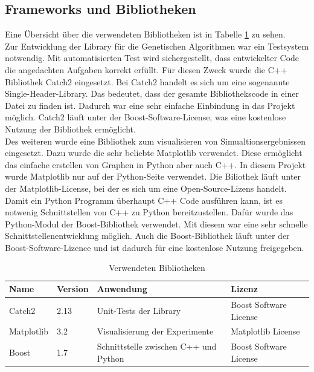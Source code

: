 \subsection{Frameworks und Bibliotheken}
Eine Übersicht über die verwendeten Bibliotheken ist in Tabelle \ref{tab:bibs} zu sehen.\\
Zur Entwicklung der Library für die Genetischen Algorithmen war ein Testsystem notwendig. Mit automatisierten Test wird sichergestellt, dass entwickelter Code die angedachten Aufgaben korrekt erfüllt.
Für diesen Zweck wurde die C++ Bibliothek Catch2 eingesetzt. Bei Catch2 handelt es sich um eine sogenannte Single-Header-Library. Das bedeutet, dass der gesamte Bibliothekscode in einer Datei zu finden ist.
Dadurch war eine sehr einfache Einbindung in das Projekt möglich. Catch2 läuft unter der Boost-Software-License, was eine kostenlose Nutzung der Bibliothek ermöglicht.\\
Des weiteren wurde eine Bibliothek zum visualisieren von Simualtionsergebnissen eingesetzt. Dazu wurde die sehr beliebte Matplotlib verwendet. Diese ermöglicht das einfache erstellen von Graphen in Python aber auch C++.
In diesem Projekt wurde Matplotlib nur auf der Python-Seite verwendet. Die Biliothek läuft unter der Matplotlib-License, bei der es sich um eine Open-Source-Lizens handelt.\\
Damit ein Python Programm überhaupt C++ Code ausführen kann, ist es notwenig Schnittstellen von C++ zu Python bereitzustellen. Dafür wurde das Python-Modul der Boost-Bibliothek verwendet. Mit diesem war eine sehr schnelle Schnittstellenentwicklung möglich.
Auch die Boost-Bibliothek läuft unter der Boost-Software-Lizence und ist dadurch für eine kostenlose Nutzung freigegeben.
\begin{table}
\caption{Verwendeten Bibliotheken}
\begin{tabular}{|l|l|l|l|}
 Name & Version & Anwendung & Lizenz \\ 
\hline
 Catch2 & 2.13 & Unit-Tests der Library & Boost Software License \\  
 Matplotlib & 3.2 & Visualisierung der Experimente & Matplotlib License \\
 Boost & 1.7 & Schnittstelle zwischen C++ und Python & Boost Software License    
\end{tabular}
\label{tab:bibs}
\end{table}

